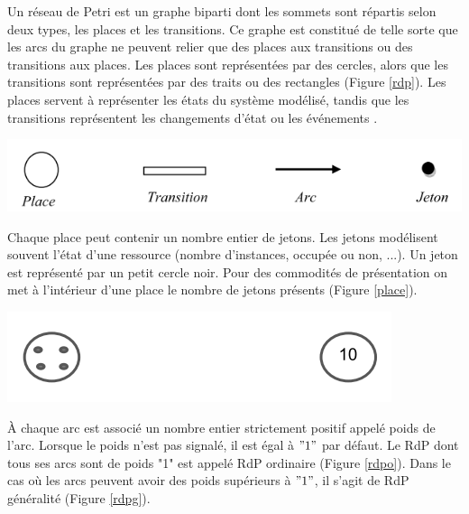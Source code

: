 \begin{definition}[Informelle]
Un réseau de Petri est un graphe biparti dont les sommets sont répartis selon deux types,  les places et les transitions. Ce graphe est constitué de telle sorte que les arcs du graphe ne peuvent relier que des places aux transitions ou des transitions aux places. Les places sont représentées par des cercles, alors que les transitions sont représentées par des traits ou des rectangles (Figure \ref{rdp}). Les places servent  à représenter les états du  système modélisé, tandis que les  transitions  représentent les changements d'état ou les événements \citep{SaidounicoursRdp2017}.

\begin{center}
	\includegraphics[scale=0.5]{img/rdp.PNG}
	 \label{rdp}
\end{center}


 Chaque place peut contenir un nombre entier de jetons. Les jetons modélisent souvent l'état d'une ressource (nombre d'instances, occupée ou non, ...). Un jeton est représenté par un petit cercle noir. Pour des commodités de présentation on met à l'intérieur d'une place le nombre de jetons présents (Figure \ref{place}). 
 
 \begin{center}
	\includegraphics[scale=0.5]{img/place.PNG}
	 \label{place}
 \end{center}

 À  chaque arc est associé un nombre entier strictement positif appelé poids de l'arc. Lorsque le poids n'est pas signalé, il est égal à $"1"$  par défaut. Le RdP dont tous ses arcs sont de poids "1" est appelé RdP ordinaire (Figure \ref{rdpo}). Dans le cas o\`{u} les arcs peuvent avoir des poids supérieurs à $"1"$, il s'agit de RdP généralité (Figure \ref{rdpg}).
 

\end{definition}
